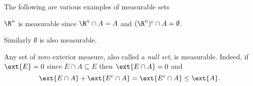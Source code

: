 \documentclass[12pt,oneside]{book}
\begin{document}
\begin{example} \label{exe:measurable sets}
	The following are various examples of measurable sets
	\begin{points}
	\item \( \R^n \) is measurable since \( \R^n \cap A = A \) and \( (\R^n)^c \cap A = \emptyset \).
	\item Similarly \( \emptyset \) is also measurable.
	\item Any set of zero exterior measure, also called a \emph{null set}, is measurable. Indeed, if \( \ext{E} = 0 \) since \( E \cap A \subseteq E \) then \( \ext{E \cap A} = 0 \) and
		\begin{equation*}
			\ext{E \cap A} + \ext{E^c \cap A} = \ext{E^c \cap A} \leq \ext{A}.
		\end{equation*}
	\end{points}
\end{example}
\end{document}
